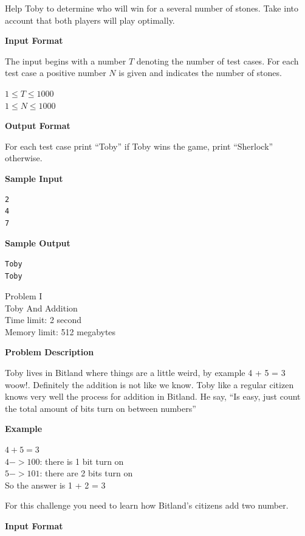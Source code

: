 \documentclass[11pt]{article}
\begin{document}
Help Toby to determine who will win for a several number of stones. Take into account that both players will play optimally.

\textbf{\large Input Format}

The input begins with a number $T$ denoting the number of test cases. For each
test case a positive number $N$ is given and indicates the number of stones.

$ 1 \le T \le 1000 $ \\
$ 1 \le N \le 1000 $

\textbf{\large Output Format}

For each test case print ``Toby'' if Toby wins the game, print ``Sherlock'' otherwise.

\textbf{\large Sample Input}

\begin{verbatim}
2
4
7
\end{verbatim}

\textbf{\large Sample Output}

\begin{verbatim}
Toby
Toby
\end{verbatim}

\newpage

        \begin{center}
            {\LARGE Problem I}\\
            {\Large Toby And Addition}\\
            {Time limit: 2 second}\\
            {Memory limit: 512 megabytes}
        \end{center}\textbf{\large Problem Description}

Toby lives in Bitland where things are a little weird,
by example 4 + 5 = 3 woow!. Definitely the addition is not like we know.
Toby like a regular citizen knows very well the process for addition in Bitland.
He say, ``Is easy, just count the total amount of bits turn on between numbers''

\textbf{\large Example}

$4 + 5 = 3$ \\
$4 -> 100$: there is 1 bit turn on \\
$5 -> 101$: there are 2 bits turn on \\

So the answer is 1 + 2 = 3

For this challenge you need to learn how Bitland's citizens add two number.

\textbf{\large Input Format}
\end{document}
